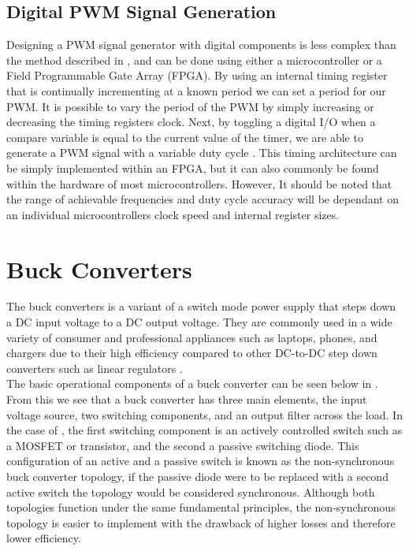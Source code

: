 \subsection{Digital PWM Signal Generation}\label{S:digital_PWM_back}

Designing a PWM signal generator with digital components is less complex than the method described in , and can be done using either a microcontroller or a Field Programmable Gate Array (FPGA). By using an internal timing register that is continually incrementing at a known period we can set a period for our PWM. It is possible to vary the period of the PWM by simply increasing or decreasing the timing registers clock. Next, by toggling a digital I/O when a compare variable is equal to the current value of the timer, we are able to generate a PWM signal with a variable duty cycle \cite{Colley2020}. 
This timing architecture can be simply implemented within an FPGA, but it can also commonly be found within the hardware of most microcontrollers. However, It should be noted that the range of achievable frequencies and duty cycle accuracy will be dependant on an individual microcontrollers clock speed and internal register sizes.

\section{Buck Converters}\label{S:buck_back}

The buck converters is a variant of a switch mode power supply that steps down a DC input voltage to a DC output voltage. They are commonly used in a wide variety of consumer and professional appliances such as laptops, phones, and chargers due to their high efficiency compared to other DC-to-DC step down converters such as linear regulators \cite{Mohan2012}.\\

The basic operational components of a buck converter can be seen below in . From this we see that a buck converter has three main elements, the input voltage source, two switching components, and an output filter across the load. In the case of , the first switching component is an actively controlled switch such as a MOSFET or transistor, and the second a passive switching diode. This configuration of an active and a passive switch is known as the non-synchronous buck converter topology, if the passive diode were to be replaced with a second active switch the topology would be considered synchronous. Although both topologies function under the same fundamental principles, the non-synchronous topology is easier to implement with the drawback of higher losses and therefore lower efficiency.\\

